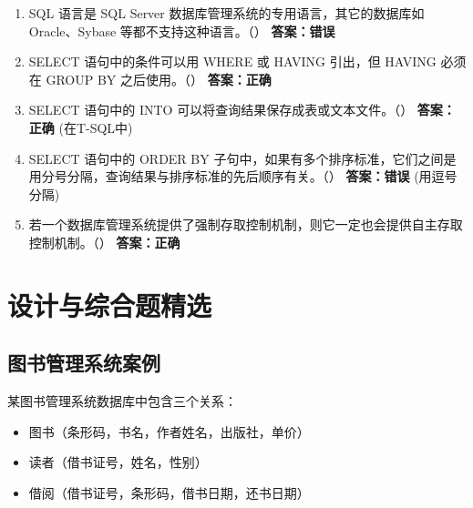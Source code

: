 \documentclass[12pt, a4paper]{article}
\begin{document}
\begin{enumerate}[label=\arabic*.]
    \item SQL 语言是 SQL Server 数据库管理系统的专用语言，其它的数据库如 Oracle、Sybase 等都不支持这种语言。（\quad）
    \textbf{答案：错误}

    \item SELECT 语句中的条件可以用 WHERE 或 HAVING 引出，但 HAVING 必须在 GROUP BY 之后使用。（\quad）
    \textbf{答案：正确}

    \item SELECT 语句中的 INTO 可以将查询结果保存成表或文本文件。（\quad）
    \textbf{答案：正确} (在T-SQL中)

    \item SELECT 语句中的 ORDER BY 子句中，如果有多个排序标准，它们之间是用分号分隔，查询结果与排序标准的先后顺序有关。（\quad）
    \textbf{答案：错误} (用逗号分隔)

    \item 若一个数据库管理系统提供了强制存取控制机制，则它一定也会提供自主存取控制机制。（\quad）
    \textbf{答案：正确}
\end{enumerate}

\section{设计与综合题精选}

\subsection*{图书管理系统案例}
某图书管理系统数据库中包含三个关系：
\begin{itemize}
    \item 图书（条形码，书名，作者姓名，出版社，单价）
    \item 读者（借书证号，姓名，性别）
    \item 借阅（借书证号，条形码，借书日期，还书日期）
\end{itemize}
\end{document}
